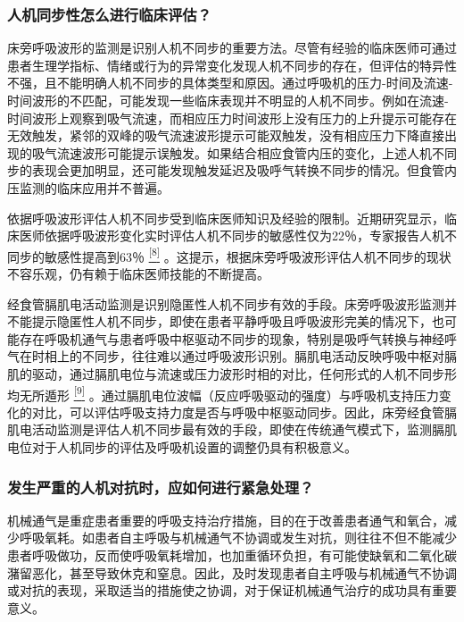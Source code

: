 \subsubsection{人机同步性怎么进行临床评估？}

床旁呼吸波形的监测是识别人机不同步的重要方法。尽管有经验的临床医师可通过患者生理学指标、情绪或行为的异常变化发现人机不同步的存在，但评估的特异性不强，且不能明确人机不同步的具体类型和原因。通过呼吸机的压力-时间及流速-时间波形的不匹配，可能发现一些临床表现并不明显的人机不同步。例如在流速-时间波形上观察到吸气流速，而相应压力时间波形上没有压力的上升提示可能存在无效触发，紧邻的双峰的吸气流速波形提示可能双触发，没有相应压力下降直接出现的吸气流速波形可能提示误触发。如果结合相应食管内压的变化，上述人机不同步的表现会更加明显，还可能发现触发延迟及吸呼气转换不同步的情况。但食管内压监测的临床应用并不普遍。

依据呼吸波形评估人机不同步受到临床医师知识及经验的限制。近期研究显示，临床医师依据呼吸波形变化实时评估人机不同步的敏感性仅为22％，专家报告人机不同步的敏感性提高到63％
\protect\hyperlink{text00016.htmlux5cux23ch8-15}{\textsuperscript{{[}8{]}}}
。这提示，根据床旁呼吸波形评估人机不同步的现状不容乐观，仍有赖于临床医师技能的不断提高。

经食管膈肌电活动监测是识别隐匿性人机不同步有效的手段。床旁呼吸波形监测并不能提示隐匿性人机不同步，即使在患者平静呼吸且呼吸波形完美的情况下，也可能存在呼吸机通气与患者呼吸中枢驱动不同步的现象，特别是吸呼气转换与神经呼气在时相上的不同步，往往难以通过呼吸波形识别。膈肌电活动反映呼吸中枢对膈肌的驱动，通过膈肌电位与流速或压力波形时相的对比，任何形式的人机不同步形均无所遁形
\protect\hyperlink{text00016.htmlux5cux23ch9-15}{\textsuperscript{{[}9{]}}}
。通过膈肌电位波幅（反应呼吸驱动的强度）与呼吸机支持压力变化的对比，可以评估呼吸支持力度是否与呼吸中枢驱动同步。因此，床旁经食管膈肌电活动监测是评估人机不同步最有效的手段，即使在传统通气模式下，监测膈肌电位对于人机同步的评估及呼吸机设置的调整仍具有积极意义。

\subsubsection{发生严重的人机对抗时，应如何进行紧急处理？}

机械通气是重症患者重要的呼吸支持治疗措施，目的在于改善患者通气和氧合，减少呼吸氧耗。如患者自主呼吸与机械通气不协调或发生对抗，则往往不但不能减少患者呼吸做功，反而使呼吸氧耗增加，也加重循环负担，有可能使缺氧和二氧化碳潴留恶化，甚至导致休克和窒息。因此，及时发现患者自主呼吸与机械通气不协调或对抗的表现，采取适当的措施使之协调，对于保证机械通气治疗的成功具有重要意义。

